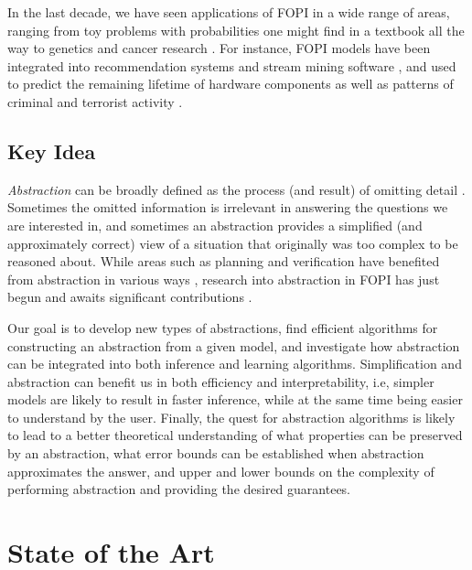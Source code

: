\documentclass{article}
\begin{document}
In the last decade, we have seen applications of FOPI in a wide range of areas,
ranging from toy problems with probabilities one might find in a textbook
\cite{DBLP:conf/ijcai/DriesKDBR17} all the way to genetics
\cite{DBLP:journals/jcb/SakhanenkoG12} and cancer research
\cite{DBLP:conf/ilp/Corte-RealD017}. For instance, FOPI models have been
integrated into recommendation systems \cite{DBLP:journals/corr/YangKAGN16} and
stream mining software \cite{DBLP:conf/icdm/ChandraSKTA14}, and used to predict
the remaining lifetime of hardware components \cite{vlasselaer2012statistical}
as well as patterns of criminal and terrorist activity
\cite{DBLP:conf/sdm/DelaneyFCWJ10}.

\subsection{Key Idea}

\emph{Abstraction} can be broadly defined as the process (and result) of
omitting detail \cite{doi:10.1086/670300}. Sometimes the omitted information is
irrelevant in answering the questions we are interested in, and sometimes an
abstraction provides a simplified (and approximately correct) view of a
situation that originally was too complex to be reasoned about. While areas such
as planning and verification have benefited from abstraction in various ways
\cite{saitta2013abstraction}, research into abstraction in FOPI has just begun
and awaits significant contributions
\cite{DBLP:journals/corr/abs-1810-02434,DBLP:conf/icml/HoltzenBM18,DBLP:conf/uai/HoltzenMB17}.

Our goal is to develop new types of abstractions, find efficient
algorithms for constructing an abstraction from a given model, and investigate
how abstraction can be integrated into both inference and learning algorithms.
Simplification and abstraction can benefit us in both efficiency and
interpretability, i.e, simpler models are likely to result in faster inference,
while at the same time being easier to understand by the user. Finally, the
quest for abstraction algorithms is likely to lead to a better theoretical
understanding of what properties can be preserved by an abstraction, what error
bounds can be established when abstraction approximates the answer, and upper
and lower bounds on the complexity of performing abstraction and providing the
desired guarantees.

\section{State of the Art}
\end{document}
